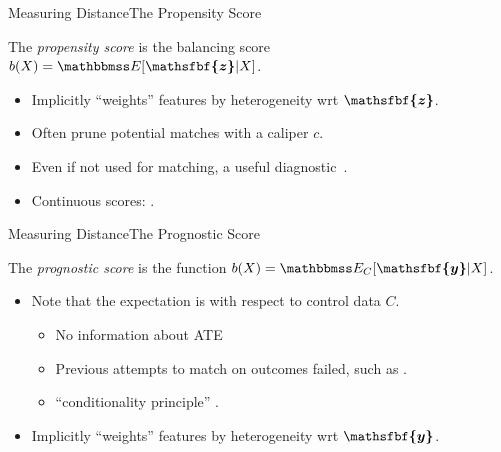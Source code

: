 \documentclass[11pt, compress]{beamer}
\renewcommand{\vec}[1]{\ensuremath{\boldsymbol{\mathsfbf{#1}}}}
\newcommand{\mat}[1]{\ensuremath{#1}}
\begin{document}
\begin{frame}{Measuring Distance}{The Propensity Score}
	\begin{definition}
		The \emph{propensity score} is the balancing score \( b(\mat{X}) = \mathbbmss E [\vec{z} | \mat{X}] \).
	\end{definition}%
	\begin{itemize}
		\item Implicitly ``weights'' features by heterogeneity wrt $\vec{z}$.
		\item Often prune potential matches with a caliper $c$.
		\item Even if not used for matching, a useful diagnostic~\parencite{dehejia_causal_1999}.
		\item Continuous scores: \textcite{imai_causal_2004}.
	\end{itemize}
\end{frame}

\begin{frame}{Measuring Distance}{The Prognostic Score}
	\begin{definition}
		The \emph{prognostic score} is the function \( b(\mat{X}) = \mathbbmss E_{C} [\vec{y} | \mat{X} ] \).
	\end{definition}
	\begin{itemize}
		\item Note that the expectation is with respect to control data $C$.
		\begin{itemize}
			\item No information about ATE
			\item Previous attempts to match on outcomes failed, such as \textcite{miettinen_stratification_1976}.
			\item  ``conditionality principle'' \textcite{hansen_prognostic_2008}.
		\end{itemize}
		\item Implicitly ``weights'' features by heterogeneity wrt $\vec{y}$.
	\end{itemize}
\end{frame}
\end{document}
